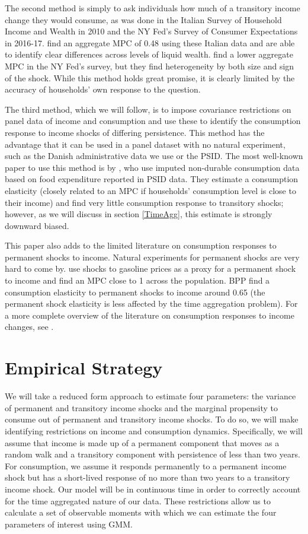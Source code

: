 \documentclass[titlepage]{\econtex}\newcommand{\texname}{ConsumptionHeterogeneity}
\begin{document}
The second method is simply to ask individuals how much of a transitory income change they would consume, as was done in the Italian Survey of Household Income and Wealth in 2010 and the NY Fed's Survey of Consumer Expectations in 2016-17. \cite{jappelli_fiscal_2014} find an aggregate MPC of 0.48 using these Italian data and are able to identify clear differences across levels of liquid wealth. \cite{fuster_what_2018} find a lower aggregate MPC in the NY Fed's survey, but they find heterogeneity by both size and sign of the shock. While this method holds great promise, it is clearly limited by the accuracy of households' own response to the question.

The third method, which we will follow, is to impose covariance restrictions on panel data of income and consumption and use these to identify the consumption response to income shocks of differing persistence. This method has the advantage that it can be used in a panel dataset with no natural experiment, such as the Danish administrative data we use or the PSID. The most well-known paper to use this method is by \cite{blundell_consumption_2008}, who use imputed non-durable consumption data based on food expenditure reported in PSID data. They estimate a consumption elasticity (closely related to an MPC if households' consumption level is close to their income) and find very little consumption response to transitory shocks; however, as we will discuss in section \ref{TimeAgg}, this estimate is strongly downward biased.

This paper also adds to the limited literature on consumption responses to permanent shocks to income. Natural experiments for permanent shocks are very hard to come by. \cite{gelman_response_2016} use shocks to gasoline prices as a proxy for a permanent shock to income and find an MPC close to 1 across the population. BPP find a consumption elasticity to permanent shocks to income around 0.65 (the permanent shock elasticity is less affected by the time aggregation problem). For a more complete overview of the literature on consumption responses to income changes, see \cite{jappelli_consumption_2010}.

\section{Empirical Strategy} \label{empirical_strategy} 
We will take a reduced form approach to estimate four parameters: the variance of permanent and transitory income shocks and the marginal propensity to consume out of permanent and transitory income shocks. To do so, we will make identifying restrictions on income and consumption dynamics. Specifically, we will assume that income is made up of a permanent component that moves as a random walk and a transitory component with persistence of less than two years. For consumption, we assume it responds permanently to a permanent income shock but has a short-lived response of no more than two years to a transitory income shock. Our model will be in continuous time in order to correctly account for the time aggregated nature of our data. These restrictions allow us to calculate a set of observable moments with which we can estimate the four parameters of interest using GMM.
\end{document}

